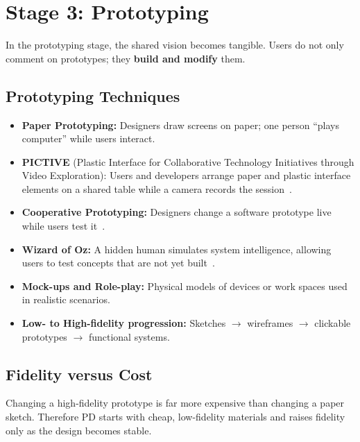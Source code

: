 \documentclass[a4paper,12pt]{article}
\begin{document}
\section{Stage 3: Prototyping}
In the prototyping stage, the shared vision becomes tangible. Users do not only comment on prototypes; they \textbf{build and modify} them.

\subsection{Prototyping Techniques}
\begin{itemize}
    \item \textbf{Paper Prototyping:} Designers draw screens on paper; one person ``plays computer'' while users interact.
    \item \textbf{PICTIVE} (Plastic Interface for Collaborative Technology Initiatives through Video Exploration): Users and developers arrange paper and plastic interface elements on a shared table while a camera records the session~\cite{muller1991}.
    \item \textbf{Cooperative Prototyping:} Designers change a software prototype live while users test it~\cite{bodker1991}.
    \item \textbf{Wizard of Oz:} A hidden human simulates system intelligence, allowing users to test concepts that are not yet built~\cite{kelley1984}.
    \item \textbf{Mock-ups and Role-play:} Physical models of devices or work spaces used in realistic scenarios.
    \item \textbf{Low- to High-fidelity progression:} Sketches $\rightarrow$ wireframes $\rightarrow$ clickable prototypes $\rightarrow$ functional systems.
\end{itemize}

\subsection{Fidelity versus Cost}
Changing a high-fidelity prototype is far more expensive than changing a paper sketch. Therefore PD starts with cheap, low-fidelity materials and raises fidelity only as the design becomes stable.
\end{document}
